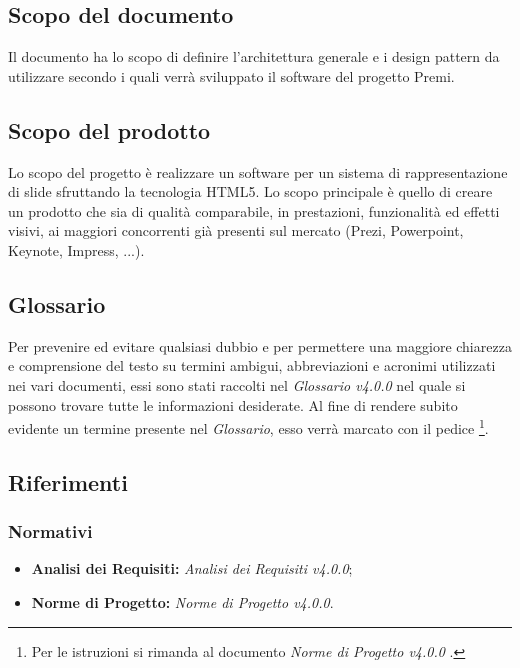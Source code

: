 \subsection{Scopo del documento}
	Il documento ha lo scopo di definire l'architettura generale e i \gls{design pattern} da utilizzare secondo i quali verrà sviluppato il software del progetto Premi.

\subsection{Scopo del prodotto}
Lo scopo del progetto è realizzare un software per un sistema di rappresentazione di \gls{slide} sfruttando la tecnologia  \gls{HTML5}. Lo scopo principale è quello di creare un prodotto che sia di qualità comparabile, in prestazioni, funzionalità ed effetti visivi, ai maggiori concorrenti già presenti sul mercato (Prezi, Powerpoint, Keynote, Impress, ...).

\subsection{Glossario}
Per prevenire ed evitare qualsiasi dubbio e per permettere una maggiore chiarezza e comprensione del testo su termini ambigui, abbreviazioni e acronimi utilizzati nei vari documenti, essi sono stati raccolti nel \textit{Glossario v4.0.0} nel quale si possono trovare tutte le informazioni desiderate.
Al fine di rendere subito evidente un termine presente nel \textit{Glossario}, esso verrà marcato con il pedice \G\footnote{Per le istruzioni si rimanda al documento \textit{Norme di Progetto v4.0.0} .}.

\subsection{Riferimenti}

\subsubsection{Normativi}
	\begin{itemize}
		\item \textbf{Analisi dei Requisiti:} \textit{Analisi dei Requisiti v4.0.0};
		\item \textbf{Norme di Progetto:} \textit{Norme di Progetto v4.0.0}.
	\end{itemize}

